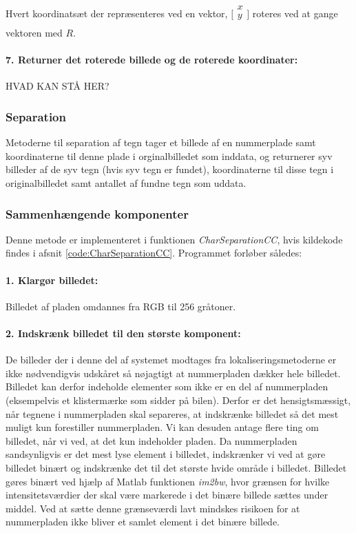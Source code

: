 Hvert koordinatsæt der repræsenteres ved en vektor, $\biggl[\begin{array}{c} x\\ y\\ \end{array}\biggr]$ roteres ved at gange vektoren med $R$.

\paragraph{7. Returner det roterede billede og de roterede koordinater:} HVAD KAN STÅ HER?

\subsubsection{Separation}

Metoderne til separation af tegn tager et billede af en nummerplade samt koordinaterne til denne plade i orginalbilledet som inddata, og returnerer syv billeder af de syv tegn (hvis syv tegn er fundet), koordinaterne til disse tegn i originalbilledet samt antallet af fundne tegn som uddata.

\subsubsection*{Sammenhængende komponenter}

Denne metode er implementeret i funktionen \textit{CharSeparationCC}, hvis kildekode findes i afsnit \vref{code:CharSeparationCC}. Programmet forløber således:

\paragraph{1. Klargør billedet:} Billedet af pladen omdannes fra RGB til 256 gråtoner.

\paragraph{2. Indskrænk billedet til den største komponent:}
De billeder der i denne del af systemet modtages fra lokaliseringsmetoderne er ikke nødvendigvis udskåret så nøjagtigt at nummerpladen dækker hele billedet. Billedet kan derfor indeholde elementer som ikke er en del af nummerpladen (eksempelvis et klistermærke som sidder på bilen). Derfor er det hensigtsmæssigt, når tegnene i nummerpladen skal separeres, at indskrænke billedet så det mest muligt kun forestiller nummerpladen. Vi kan desuden antage flere ting om billedet, når vi ved, at det kun indeholder pladen. Da nummerpladen sandsynligvis er det mest lyse element i billedet, indskrænker vi ved at gøre billedet binært og indskrænke det til det største hvide område i billedet. Billedet gøres binært ved hjælp af Matlab funktionen \textit{im2bw}, hvor grænsen for hvilke intensitetsværdier der skal være markerede i det binære billede sættes under middel. Ved at sætte denne grænseværdi lavt mindskes risikoen for at nummerpladen ikke bliver et samlet element i det binære billede.

